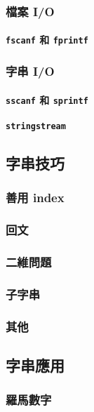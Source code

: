 \documentclass[12pt,a4paper,oneside]{article}
\begin{document}
\begin{CJK}{UTF8}{bkai}
\subsubsection{檔案 I/O}
\paragraph{\lstinline!fscanf! 和 \lstinline!fprintf!}

\subsubsection{字串 I/O}
\paragraph{\lstinline!sscanf! 和 \lstinline!sprintf!}
\paragraph{\lstinline!stringstream!}


\subsection{字串技巧}
\subsubsection{善用 index}
\subsubsection{回文}
\subsubsection{二維問題}
\subsubsection{子字串}
\subsubsection{其他}


\subsection{字串應用}
\subsubsection{羅馬數字}


\end{CJK}
\end{document}
